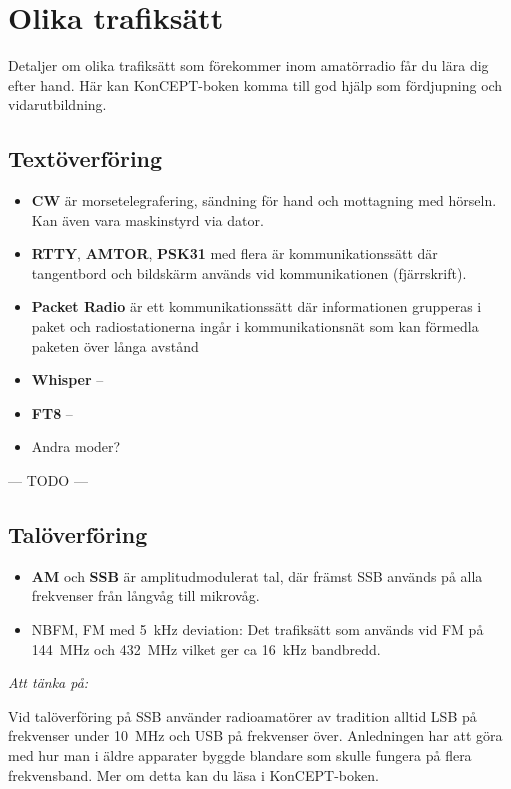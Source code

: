 \section{Olika trafiksätt}

Detaljer om olika trafiksätt som förekommer inom amatörradio får du lära dig efter hand. Här kan KonCEPT-boken komma till god hjälp som fördjupning och vidarutbildning.

\subsection{Textöverföring}

\begin{itemize}
	\item \textbf{CW} är morsetelegrafering, sändning för hand och mottagning med hörseln. Kan även vara maskinstyrd via dator.
	\item \textbf{RTTY}, \textbf{AMTOR}, \textbf{PSK31} med flera är kommunikationssätt där tangentbord och bildskärm används vid kommunikationen (fjärrskrift).
	\item \textbf{Packet Radio} är ett kommunikationssätt där informationen grupperas i paket och radiostationerna ingår i kommunikationsnät som kan förmedla paketen över långa avstånd
	\item \textbf{Whisper} -- 
	\item \textbf{FT8} --
	\item Andra moder?
\end{itemize}

--- TODO ---

\subsection{Talöverföring}

\begin{itemize}
	\item \textbf{AM} och \textbf{SSB} är amplitudmodulerat tal, där främst SSB används på alla frekvenser från långvåg till mikrovåg.
	\item NBFM, FM med \SI{5}{kHz} deviation: Det trafiksätt som används vid FM på \SI{144}{MHz} och \SI{432}{MHz} vilket ger ca \SI{16}{kHz} bandbredd.
\end{itemize}

\emph{Att tänka på:}

Vid talöverföring på SSB använder radioamatörer av tradition alltid LSB på frekvenser under \SI{10}{MHz} och USB på frekvenser över. Anledningen har att göra med hur man i äldre apparater byggde blandare som skulle fungera på flera frekvensband. Mer om detta kan du läsa i KonCEPT-boken.

